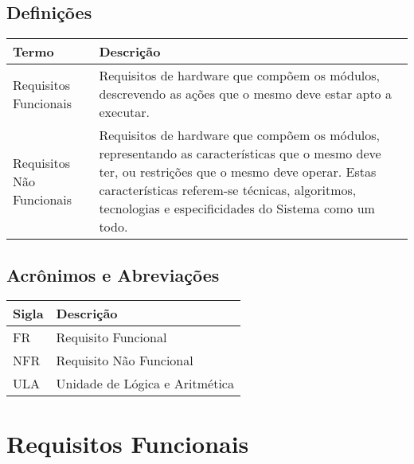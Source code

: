 \documentclass{report}
\begin{document}
  \subsection{Definições}
    \FloatBarrier
    \begin{table}[H]
      \begin{center}
        \begin{tabular}[pos]{|m{5cm} | m{9cm}|} 
          \hline
          \cellcolor[gray]{0.9}\textbf{Termo} & \cellcolor[gray]{0.9}\textbf{Descrição} \\ \hline
          Requisitos Funcionais & Requisitos de hardware que compõem os módulos, descrevendo as ações que o mesmo deve estar apto a executar.   \\ \hline
          Requisitos Não Funcionais & Requisitos de hardware que compõem os módulos, representando as características que o mesmo deve ter, ou restrições que o mesmo deve operar. Estas características referem-se técnicas, algoritmos, tecnologias e especificidades do Sistema como um todo.  \\ \hline
        \end{tabular}
      \end{center}
    \end{table}  

  \subsection{Acrônimos e Abreviações}
    \FloatBarrier
    \begin{table}[H]
      \begin{center}
        \begin{tabular}[pos]{|m{2cm} | m{12cm}|} 
          \hline
          \cellcolor[gray]{0.9}\textbf{Sigla} & \cellcolor[gray]{0.9}\textbf{Descrição} \\ \hline
          FR      & Requisito Funcional  \\ \hline
          NFR     & Requisito Não Funcional  \\ \hline
          ULA     & Unidade de Lógica e Aritmética  \\ \hline
        \end{tabular}
      \end{center}
    \end{table}  

  \section{Requisitos Funcionais}
\end{document}
